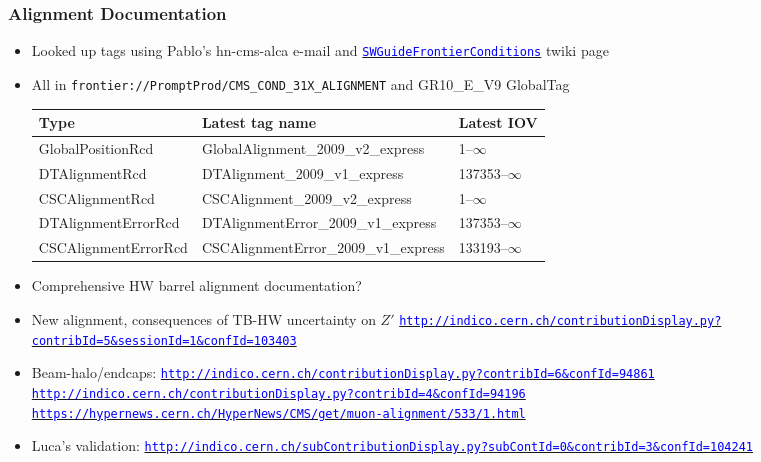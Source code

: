 \documentclass[compress]{beamer}
\begin{document}
\begin{frame}
\frametitle{Alignment Documentation}
\begin{itemize}
\item Looked up tags using Pablo's hn-cms-alca e-mail and \href{https://twiki.cern.ch/twiki/bin/view/CMS/SWGuideFrontierConditions}{\tt \textcolor{blue}{SWGuideFrontierConditions}} twiki page

\item All in {\tt \tiny frontier://PromptProd/CMS\_COND\_31X\_ALIGNMENT} and GR10\_E\_V9 GlobalTag

\begin{tabular}{l l l}
\tiny Type & \tiny Latest tag name & \tiny Latest IOV \\\hline
\tiny GlobalPositionRcd & \tiny GlobalAlignment\_2009\_v2\_express & \tiny 1--$\infty$ \\
\tiny DTAlignmentRcd & \tiny DTAlignment\_2009\_v1\_express & \tiny 137353--$\infty$ \\
\tiny CSCAlignmentRcd & \tiny CSCAlignment\_2009\_v2\_express & \tiny 1--$\infty$ \\
\tiny DTAlignmentErrorRcd & \tiny DTAlignmentError\_2009\_v1\_express & \tiny 137353--$\infty$ \\
\tiny CSCAlignmentErrorRcd & \tiny CSCAlignmentError\_2009\_v1\_express & \tiny 133193--$\infty$ \\
\end{tabular}

\item Comprehensive HW barrel alignment documentation?

\item New alignment, consequences of TB-HW uncertainty on $Z'$ \href{http://indico.cern.ch/contributionDisplay.py?contribId=5&sessionId=1&confId=103403}{\tt \tiny \textcolor{blue}{http://indico.cern.ch/contributionDisplay.py?contribId=5\&sessionId=1\&confId=103403}}

\item Beam-halo/endcaps: \href{http://indico.cern.ch/contributionDisplay.py?contribId=6&confId=94861}{\tt \tiny \textcolor{blue}{http://indico.cern.ch/contributionDisplay.py?contribId=6\&confId=94861}}
\href{http://indico.cern.ch/contributionDisplay.py?contribId=4&confId=94196}{\tt \tiny \textcolor{blue}{http://indico.cern.ch/contributionDisplay.py?contribId=4\&confId=94196}}
\href{https://hypernews.cern.ch/HyperNews/CMS/get/muon-alignment/533/1.html}{\tt \tiny \textcolor{blue}{https://hypernews.cern.ch/HyperNews/CMS/get/muon-alignment/533/1.html}}

\item Luca's validation: \href{http://indico.cern.ch/subContributionDisplay.py?subContId=0&contribId=3&confId=104241}{\tt \tiny \textcolor{blue}{http://indico.cern.ch/subContributionDisplay.py?subContId=0\&contribId=3\&confId=104241}}

\end{itemize}
\end{frame}
\end{document}
